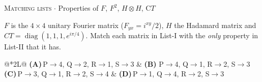\documentclass[11pt,a4paper]{article}
\newcommand{\optlabel}[1]{\textbf{(#1)}}
\newcommand{\correctlabel}[1]{\textcolor{okgreen}{\textbf{(#1)}\,\ding{51}}}
\newenvironment{qitem}[1]{\begin{list}{}{\setlength{\leftmargin}{3.3em}\setlength{\labelwidth}{3.1em}%
  \setlength{\labelsep}{0.2em}\setlength{\topsep}{3pt}\setlength{\parsep}{3pt}}\item[\textbf{Q.#1}\hfill]}{\end{list}}
\newcommand{\qmeta}[2]{{\footnotesize\color{black!60}\textsc{#1} \;$\cdot$\; #2}\par}
\begin{document}
\begin{qitem}{16}
\qmeta{Matching lists}{Properties of $F$, $F^2$, $H\otimes H$, C$T$}
$F$ is the $4\times4$ unitary Fourier matrix ($F_{yx} = i^{xy}/2$), $H$ the Hadamard matrix and
$CT = \operatorname{diag}(1, 1, 1, e^{i\pi/4})$. Match each matrix in List-I with the \emph{only} property in List-II that it has.
\par\smallskip{}
\par\smallskip\noindent\begin{tabularx}{\linewidth}{@{}*{2}{L}@{}}
\optlabel{A}\,P$\to$4, Q$\to$2, R$\to$1, S$\to$3 & \correctlabel{B}\,P$\to$4, Q$\to$1, R$\to$2, S$\to$3 \\[3pt]
\optlabel{C}\,P$\to$3, Q$\to$1, R$\to$2, S$\to$4 & \optlabel{D}\,P$\to$1, Q$\to$4, R$\to$2, S$\to$3
\end{tabularx}
\end{qitem}
\end{document}

